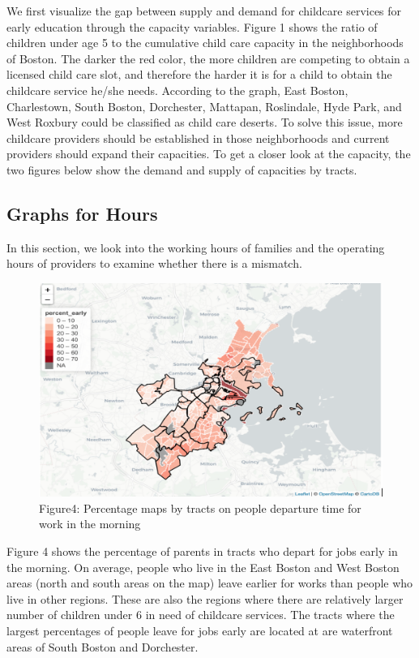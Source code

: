 \documentclass[10pt,letterpaper]{article}
\begin{document}
We first visualize the gap between supply and demand for childcare
services for early education through the capacity variables. Figure 1
shows the ratio of children under age 5 to the cumulative child care
capacity in the neighborhoods of Boston. The darker the red color, the
more children are competing to obtain a licensed child care slot, and
therefore the harder it is for a child to obtain the childcare service
he/she needs. According to the graph, East Boston, Charlestown, South
Boston, Dorchester, Mattapan, Roslindale, Hyde Park, and West Roxbury
could be classified as child care deserts. To solve this issue, more
childcare providers should be established in those neighborhoods and
current providers should expand their capacities. To get a closer look
at the capacity, the two figures below show the demand and supply of
capacities by tracts.

\subsection{Graphs for Hours}\label{graphs-for-hours}

In this section, we look into the working hours of families and the
operating hours of providers to examine whether there is a mismatch.

\begin{figure}

{\centering \includegraphics[width=0.25\linewidth]{fig4} 

}

\caption{Figure4: Percentage maps by tracts on people departure time for work in the morning}\label{fig:unnamed-chunk-6}
\end{figure}

Figure 4 shows the percentage of parents in tracts who depart for jobs
early in the morning. On average, people who live in the East Boston and
West Boston areas (north and south areas on the map) leave earlier for
works than people who live in other regions. These are also the regions
where there are relatively larger number of children under 6 in need of
childcare services. The tracts where the largest percentages of people
leave for jobs early are located at are waterfront areas of South Boston
and Dorchester.
\end{document}
